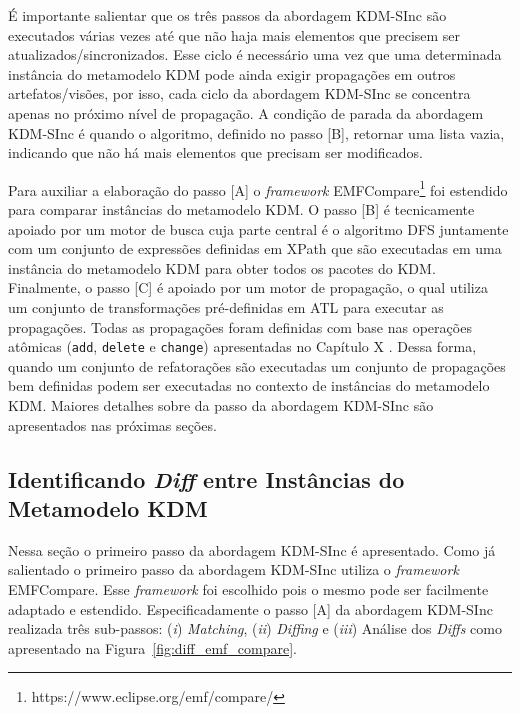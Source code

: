 É importante salientar que os três passos da abordagem KDM-SInc são executados várias vezes até que não haja mais elementos que precisem ser atualizados/sincronizados. Esse ciclo é necessário uma vez que uma determinada instância do metamodelo KDM pode ainda exigir propagações em outros artefatos/visões, por isso, cada ciclo da abordagem KDM-SInc se concentra apenas no próximo nível de propagação. A condição de parada da abordagem KDM-SInc é quando o algoritmo, definido no passo [B], retornar uma lista vazia, indicando que não há mais elementos que precisam ser modificados.

Para auxiliar a elaboração do passo [A] o \textit{framework} EMFCompare\footnote{https://www.eclipse.org/emf/compare/} foi estendido para comparar instâncias do metamodelo KDM. O passo [B] é tecnicamente apoiado por um motor de busca cuja parte central é o algoritmo DFS juntamente com um conjunto de expressões definidas em XPath que são executadas em uma instância do metamodelo KDM para obter todos os pacotes do KDM. Finalmente, o passo [C] é apoiado por um motor de propagação, o qual utiliza um conjunto de transformações pré-definidas em ATL para executar as propagações. Todas as propagações foram definidas com base nas operações atômicas (\texttt{add}, \texttt{delete} e \texttt{change}) apresentadas no Capítulo X . Dessa forma, quando um conjunto de refatorações são executadas um conjunto de propagações bem definidas podem ser executadas no contexto de instâncias do metamodelo KDM. Maiores detalhes sobre da passo da abordagem KDM-SInc são apresentados nas próximas seções.

\subsection{Identificando \textit{Diff} entre Instâncias do Metamodelo KDM}\label{sec:diff_entre_kdm}

Nessa seção o primeiro passo da abordagem KDM-SInc é apresentado. Como já salientado o primeiro passo da abordagem KDM-SInc utiliza o \textit{framework} EMFCompare. Esse \textit{framework} foi escolhido pois o mesmo pode ser facilmente adaptado e estendido. Especificadamente o passo [A] da abordagem KDM-SInc realizada três sub-passos: (\textit{i}) \textit{Matching}, (\textit{ii}) \textit{Diffing} e (\textit{iii}) Análise dos \textit{Diffs} como apresentado na Figura~\ref{fig:diff_emf_compare}. 

